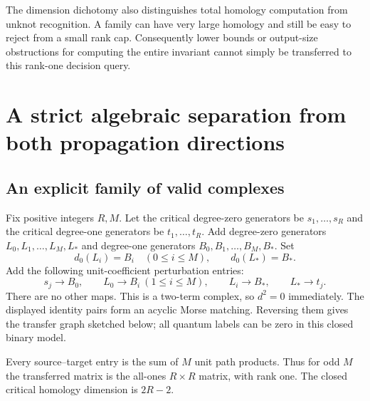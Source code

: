 \documentclass[11pt,letterpaper]{article}
\theoremstyle{definition}\newtheorem{definition}[theorem]{Definition}
\theoremstyle{remark}\newtheorem{remark}[theorem]{Remark}
\begin{document}
The dimension dichotomy also distinguishes total homology computation from
unknot recognition. A family can have very large homology and still be easy
to reject from a small rank cap. Consequently lower bounds or output-size
obstructions for computing the entire invariant cannot simply be transferred
to this rank-one decision query.

\section{A strict algebraic separation from both propagation directions}
\subsection{An explicit family of valid complexes}
Fix positive integers $R,M$. Let the critical degree-zero generators be
$s_1,\ldots,s_R$ and the critical degree-one generators be
$t_1,\ldots,t_R$. Add degree-zero generators $L_0,L_1,\ldots,L_M,L_\ast$
and degree-one generators $B_0,B_1,\ldots,B_M,B_\ast$. Set
\[
 d_0(L_i)=B_i\quad(0\leq i\leq M),\qquad d_0(L_\ast)=B_\ast.
\]
Add the following unit-coefficient perturbation entries:
\[
 s_j\longrightarrow B_0,\qquad
 L_0\longrightarrow B_i\ (1\leq i\leq M),\qquad
 L_i\longrightarrow B_\ast,\qquad
 L_\ast\longrightarrow t_j.
\]
There are no other maps. This is a two-term complex, so $d^2=0$ immediately.
The displayed identity pairs form an acyclic Morse matching. Reversing them
gives the transfer graph sketched below; all quantum labels can be zero in
this closed binary model.
\begin{center}
\end{center}
Every source--target entry is the sum of $M$ unit path products. Thus for
odd $M$ the transferred matrix is the all-ones $R\times R$ matrix, with
rank one. The closed critical homology dimension is $2R-2$.
\end{document}
